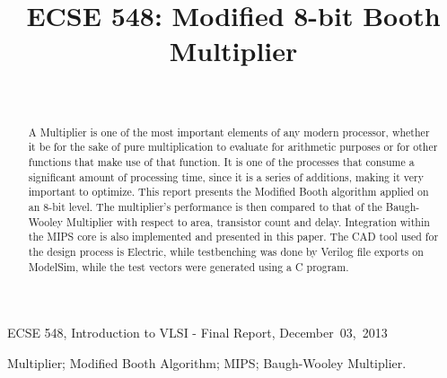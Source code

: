 \documentclass[journal]{IEEEtran}
\begin{document}
\title{ECSE 548: Modified 8-bit Booth Multiplier}
\author{\\
}

%
{ECSE 548, Introduction to VLSI - Final Report, December~03,~2013}

\maketitle
\IEEEpeerreviewmaketitle


\graphicspath{ {./figures/} }


\begin{abstract}
A Multiplier is one of the most important elements of any modern processor, whether it be for the sake of pure multiplication to evaluate for arithmetic purposes or for other functions that make use of that function. It is one of the processes that consume a significant amount of processing time, since it is a series of additions, making it very important to optimize. This report presents the Modified Booth algorithm applied on an 8-bit level. The multiplier’s performance is then compared to that of the Baugh-Wooley Multiplier with respect to area, transistor count and delay. Integration within the MIPS core is also implemented and presented in this paper. The CAD tool used for the design process is Electric, while testbenching was done by Verilog file exports on ModelSim, while the test vectors were generated using a C program.
\end{abstract}



\begin{IEEEkeywords}
Multiplier; Modified Booth Algorithm; MIPS; Baugh-Wooley Multiplier.
\end{IEEEkeywords}
\end{document}
